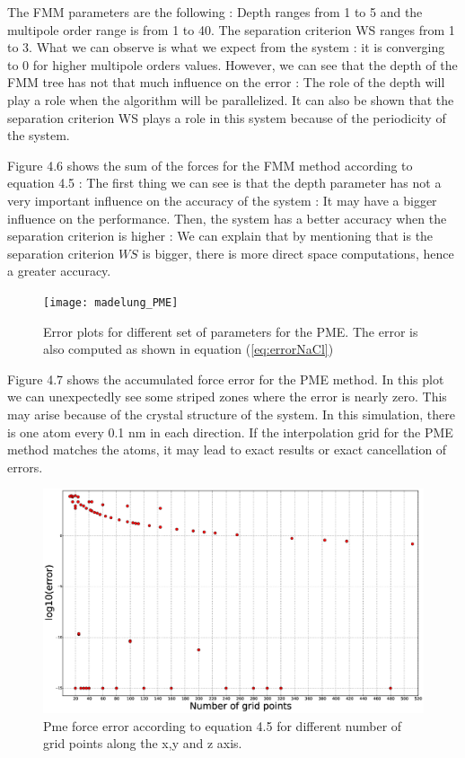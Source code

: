 \documentclass[10pt,twoside,a4paper]{report}
\begin{document}
	The FMM parameters are the following : Depth ranges from 1 to 5 and the multipole order range is from 1 to 40. The separation criterion WS ranges from 1 to 3.
	What we can observe is what we expect from the system : it is converging to $0$ for higher multipole orders values. However, we can see that the depth of the FMM tree has not that much influence on the error : The role of the depth will play a role when the algorithm will be parallelized. It can also be shown that the separation criterion WS plays a role in this system because of the periodicity of the system.
	
	
	Figure 4.6 shows the sum of the forces for the FMM method according to equation 4.5 : The first thing we can see is that the depth parameter has not a very important influence on the accuracy of the system : It may have a bigger influence on the performance. Then, the system has a better accuracy when the separation criterion is higher : We can explain that by mentioning that is the separation criterion $WS$ is bigger, there is more direct space computations, hence a greater accuracy.

	\begin{figure}[H]
	   \texttt{[image: madelung\_PME]}
	    \centering 
    \caption{Error plots for different set of parameters for the PME.  The error is also computed as shown in equation (\ref{eq:errorNaCl})}    
   \end{figure}  	
	
	Figure 4.7 shows the accumulated force error for the PME method.	In this plot we can unexpectedly see some striped zones where the error is nearly zero. This may arise because of the crystal structure of the system. In this simulation, there is one atom every 0.1 nm in each direction. If the interpolation grid for the PME method matches the atoms, it may lead to exact results or exact cancellation of errors.
		
	\begin{figure}[H]
	   \includegraphics[scale=0.3]{gridPoints}
	    \centering 
    \caption{Pme force error according to equation 4.5 for different number of grid points along the x,y and z axis.}    
		\label{fig:grid}   
   \end{figure}  
   
\end{document}
